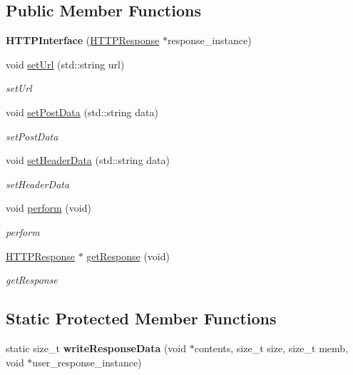 \subsection*{Public Member Functions}
\begin{DoxyCompactItemize}
\item 
\mbox{\label{classAuth_1_1HTTPInterface_af841ffd92bdf7bc099c42c2793c471ee}} 
{\bfseries H\+T\+T\+P\+Interface} (\hyperlink{classAuth_1_1HTTPResponse}{H\+T\+T\+P\+Response} $\ast$response\+\_\+instance)
\item 
void \hyperlink{classAuth_1_1HTTPInterface_afd8f3f0a92345fcece6a4851d8bbe0bf}{set\+Url} (std\+::string url)
\begin{DoxyCompactList}\small\item\em set\+Url \end{DoxyCompactList}\item 
void \hyperlink{classAuth_1_1HTTPInterface_a44a5ec483fcd6088e13a372f651d87d7}{set\+Post\+Data} (std\+::string data)
\begin{DoxyCompactList}\small\item\em set\+Post\+Data \end{DoxyCompactList}\item 
void \hyperlink{classAuth_1_1HTTPInterface_a1e32cd183942b8705785280ef6ee4d41}{set\+Header\+Data} (std\+::string data)
\begin{DoxyCompactList}\small\item\em set\+Header\+Data \end{DoxyCompactList}\item 
void \hyperlink{classAuth_1_1HTTPInterface_acb184003ca339f704cfe1fbb2e1dd7de}{perform} (void)
\begin{DoxyCompactList}\small\item\em perform \end{DoxyCompactList}\item 
\hyperlink{classAuth_1_1HTTPResponse}{H\+T\+T\+P\+Response} $\ast$ \hyperlink{classAuth_1_1HTTPInterface_a02099413f03853c33303d1d490ceb288}{get\+Response} (void)
\begin{DoxyCompactList}\small\item\em get\+Response \end{DoxyCompactList}\end{DoxyCompactItemize}
\subsection*{Static Protected Member Functions}
\begin{DoxyCompactItemize}
\item 
\mbox{\label{classAuth_1_1HTTPInterface_a65f5944d96b63139df2878425f28adf5}} 
static size\+\_\+t {\bfseries write\+Response\+Data} (void $\ast$contents, size\+\_\+t size, size\+\_\+t memb, void $\ast$user\+\_\+response\+\_\+instance)
\end{DoxyCompactItemize}
